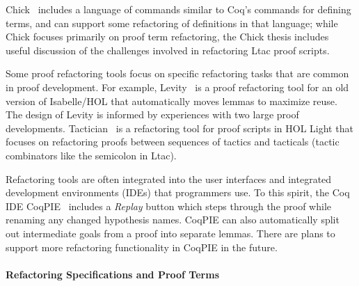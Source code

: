 Chick~\cite{robert2018front} includes a language of commands similar to Coq's commands for defining terms,
and can support some refactoring of definitions in that language;
while Chick focuses primarily on proof term refactoring, the Chick thesis
includes useful discussion of the challenges involved in refactoring Ltac proof scripts.

Some proof refactoring tools focus on specific refactoring tasks that are common in proof development.
For example, Levity~\cite{Bourke12} is a proof refactoring tool for an old version of Isabelle/HOL that automatically
moves lemmas %
to maximize reuse. The design of Levity is informed by
experiences with two large proof developments.
Tactician~\cite{adams2015} is a refactoring tool for proof scripts in HOL Light
that focuses on refactoring proofs between sequences of tactics and tacticals (tactic combinators like
the semicolon in Ltac).

Refactoring tools are often integrated into the user interfaces and integrated development environments (IDEs) %
that programmers use. To this spirit, the Coq IDE CoqPIE~\cite{Roe2016} %
includes a \textit{Replay} button which steps through the proof while renaming
any changed hypothesis names. 
CoqPIE can also automatically split out intermediate goals from a proof into separate lemmas. %
There are plans to support more refactoring functionality in CoqPIE in the future. %


\paragraph{Refactoring Specifications and Proof Terms} %


